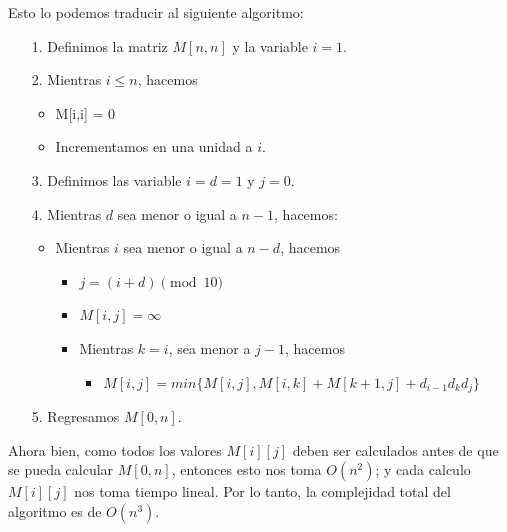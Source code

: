 \documentclass[letterpaper,11pt]{article}
\begin{document}
\begin{enumerate}
\begin{enumerate}
        Esto lo podemos traducir al siguiente algoritmo:
        \begin{itemize}
            \item[1.] Definimos la matriz $M[n, n]$ y la variable $i = 1$.

            \item[2.] Mientras $i \leq n$, hacemos 
            \begin{itemize}
                \item M[i,i] = 0
                \item Incrementamos en una unidad a $i$.
            \end{itemize}

            \item[3.] Definimos las variable $i = d = 1$ y $j = 0$.

            \item [4.] Mientras $d$ sea menor o igual a $n-1$, hacemos:
            \begin{itemize}
                \item Mientras $i$ sea menor o igual a $n-d$, hacemos 
                \begin{itemize}
                    \item $j = (i + d) \pmod{10}$

                    \item $M[i,j] = \infty$

                    \item Mientras $k = i$, sea menor a $j-1$, hacemos
                    \begin{itemize}
                        \item $M[i,j] = min\{M[i,j], M[i,k]+M[k+1, j] + 
                        d_{i-1}d_{k}d_{j}\}$
                    \end{itemize}
                \end{itemize}
            \end{itemize}

            \item[5.] Regresamos $M[0,n]$.
        \end{itemize}

        Ahora bien, como todos los valores $M[i][j]$ deben ser calculados antes 
        de que se pueda calcular $M[0,n]$, entonces esto nos toma $O(n^2)$; y 
        cada calculo $M[i][j]$ nos toma tiempo lineal. Por lo tanto, la 
        complejidad total del algoritmo es de $O(n^3)$.
        

\end{enumerate}
\end{enumerate}
\end{document}
